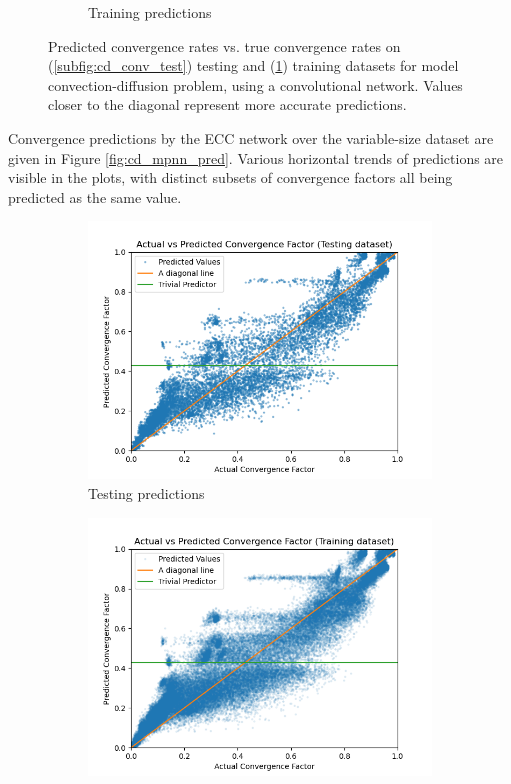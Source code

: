 \documentclass[review]{siamart190516}
\begin{document}
\begin{figure}[h]
\begin{subfigure}{.48\textwidth}
    \caption{Training predictions}
    \label{subfig:cd_conv_train}
  \end{subfigure}
  \caption{Predicted convergence rates vs. true convergence rates on (\ref{subfig:cd_conv_test}) testing and (\ref{subfig:cd_conv_train}) training datasets for model convection-diffusion problem, using a convolutional network. Values closer to the diagonal represent more accurate predictions. }
  \label{fig:cd_conv_pred}
\end{figure}

Convergence predictions by the ECC network over the variable-size dataset are given in Figure \ref{fig:cd_mpnn_pred}.  Various horizontal trends of predictions are visible in the plots, with distinct subsets of convergence factors all being predicted as the same value.

\begin{figure}[h]
  \centering
  \begin{subfigure}{.48\textwidth}
    \includegraphics[width=\textwidth]{figs/cd_var_conv_mpnn_test_pred.png}
    \caption{Testing predictions}
    \label{subfig:cd_mpnn_test}
  \end{subfigure}
  \begin{subfigure}{.48\textwidth}
    \includegraphics[width=\textwidth]{figs/cd_var_conv_mpnn_train_pred.png}

\end{subfigure}
\end{figure}
\end{document}
